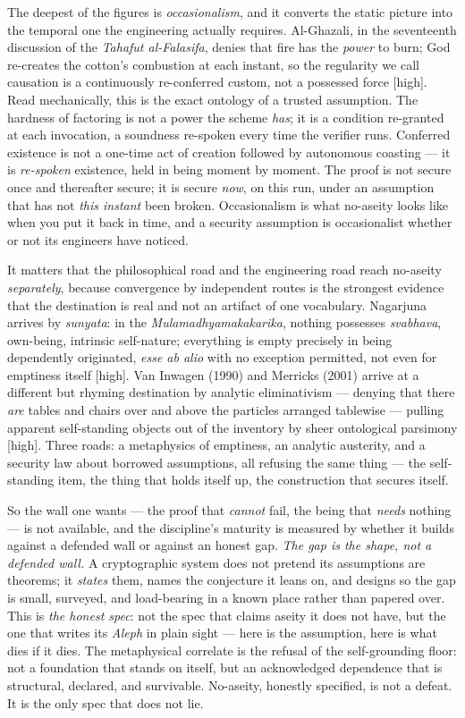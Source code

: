 \documentclass[11pt]{article}
\begin{document}
The deepest of the figures is \emph{occasionalism}, and it converts the static picture into the temporal one the engineering actually requires. Al-Ghazali, in the seventeenth discussion of the \emph{Tahafut al-Falasifa}, denies that fire has the \emph{power} to burn; God re-creates the cotton's combustion at each instant, so the regularity we call causation is a continuously re-conferred custom, not a possessed force [high]. Read mechanically, this is the exact ontology of a trusted assumption. The hardness of factoring is not a power the scheme \emph{has}; it is a condition re-granted at each invocation, a soundness re-spoken every time the verifier runs. Conferred existence is not a one-time act of creation followed by autonomous coasting — it is \emph{re-spoken} existence, held in being moment by moment. The proof is not secure once and thereafter secure; it is secure \emph{now}, on this run, under an assumption that has not \emph{this instant} been broken. Occasionalism is what no-aseity looks like when you put it back in time, and a security assumption is occasionalist whether or not its engineers have noticed.

It matters that the philosophical road and the engineering road reach no-aseity \emph{separately}, because convergence by independent routes is the strongest evidence that the destination is real and not an artifact of one vocabulary. Nagarjuna arrives by \emph{sunyata}: in the \emph{Mulamadhyamakakarika}, nothing possesses \emph{svabhava}, own-being, intrinsic self-nature; everything is empty precisely in being dependently originated, \emph{esse ab alio} with no exception permitted, not even for emptiness itself [high]. Van Inwagen (1990) and Merricks (2001) arrive at a different but rhyming destination by analytic eliminativism — denying that there \emph{are} tables and chairs over and above the particles arranged tablewise — pulling apparent self-standing objects out of the inventory by sheer ontological parsimony [high]. Three roads: a metaphysics of emptiness, an analytic austerity, and a security law about borrowed assumptions, all refusing the same thing — the self-standing item, the thing that holds itself up, the construction that secures itself.

So the wall one wants — the proof that \emph{cannot} fail, the being that \emph{needs} nothing — is not available, and the discipline's maturity is measured by whether it builds against a defended wall or against an honest gap. \emph{The gap is the shape, not a defended wall.} A cryptographic system does not pretend its assumptions are theorems; it \emph{states} them, names the conjecture it leans on, and designs so the gap is small, surveyed, and load-bearing in a known place rather than papered over. This is \emph{the honest spec}: not the spec that claims aseity it does not have, but the one that writes its \emph{Aleph} in plain sight — here is the assumption, here is what dies if it dies. The metaphysical correlate is the refusal of the self-grounding floor: not a foundation that stands on itself, but an acknowledged dependence that is structural, declared, and survivable. No-aseity, honestly specified, is not a defeat. It is the only spec that does not lie.
\end{document}
